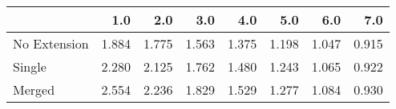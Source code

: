 \begin{tabular}{lrrrrrrr}
\toprule
{} &   1.0 &   2.0 &   3.0 &   4.0 &   5.0 &   6.0 &   7.0 \\
\midrule
No Extension & 1.884 & 1.775 & 1.563 & 1.375 & 1.198 & 1.047 & 0.915 \\
Single       & 2.280 & 2.125 & 1.762 & 1.480 & 1.243 & 1.065 & 0.922 \\
Merged       & 2.554 & 2.236 & 1.829 & 1.529 & 1.277 & 1.084 & 0.930 \\
\bottomrule
\end{tabular}
